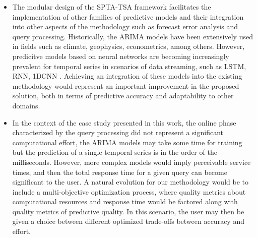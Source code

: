 \begin{itemize}
    \item The modular design of the SPTA-TSA framework facilitates the implementation of other families of predictive models and their integration into other aspects of the methodology such as forecast error analysis and query processing. Historically, the ARIMA models have been extensively used in fields such as climate, geophysics, econometrics, among others. However, predicitve models based on neural networks are becoming increasingly prevalent for temporal series in scenarios of data streaming, such as LSTM, RNN, 1DCNN \cite{Shen2020, Torres2021}. Achieving an integration of these models into the existing methodology would represent an important improvement in the proposed solution, both in terms of predictive accuracy and adaptability to other domains.

    \item In the context of the case study presented in this work, the online phase characterized by the query processing did not represent a significant computational effort, the ARIMA models may take some time for training but the prediction of a single temporal series is in the order of the milliseconds. However, more complex models would imply perceivable service times, and then the total response time for a given query can become significant to the user. A natural evolution for our methodology would be to include a multi-objective optimization process, where quality metrics about computational resources and response time would be factored along with quality metrics of predictive quality. In this scenario, the user may then be given a choice between different optimized trade-offs between accuracy and effort.
\end{itemize}


